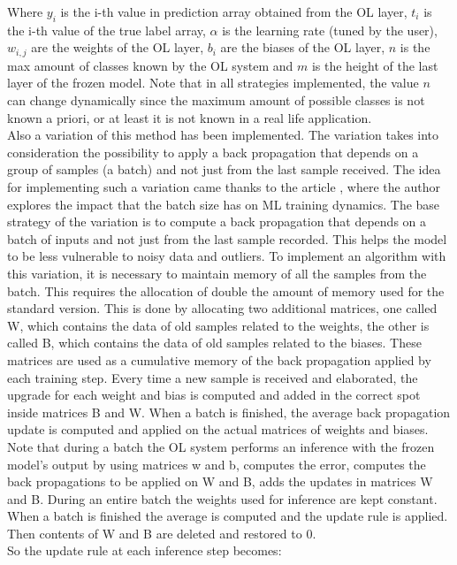 \documentclass[12pt]{report}
\begin{document}
Where $y_i$ is the i-th value in prediction array obtained from the OL layer, $t_i$ is the i-th value of the true label array, $\alpha$ is the learning rate (tuned by the user), $w_{i,j}$ are the weights of the OL layer, $b_i$ are the biases of the OL layer, $n$ is the max amount of classes known by the OL system and $m$ is the height of the last layer of the frozen model. Note that in all strategies implemented, the value $n$ can change dynamically since the maximum amount of possible classes is not known a priori, or at least it is not known in a real life application. \\
Also a variation of this method has been implemented. The variation takes into consideration the possibility to apply a back propagation that depends on a group of samples (a batch) and not just from the last sample received. The idea for implementing such a variation came thanks to the article \autocite{batch_size_medium}, where the author explores the impact that the batch size has on ML training dynamics. The base strategy of the variation is to compute a back propagation that depends on a batch of inputs and not just from the last sample recorded. This helps the model to be less vulnerable to noisy data and outliers. To implement an algorithm with this variation, it is necessary to maintain memory of all the samples from the batch. This requires the allocation of double the amount of memory used for the standard version. This is done by allocating two additional matrices, one called W, which contains the data of old samples related to the weights, the other is called B, which contains the data of old samples related to the biases. These matrices are used as a cumulative memory of the back propagation applied by each training step. Every time a new sample is received and elaborated, the upgrade for each weight and bias is computed and added in the correct spot inside matrices B and W. When a batch is finished, the average back propagation update is computed and applied on the actual matrices of weights and biases. Note that during a batch the OL system performs an inference with the frozen model's output by using matrices w and b, computes the error, computes the back propagations to be applied on W and B, adds the updates in matrices W and B. During an entire batch the weights used for inference are kept constant. When a batch is finished the average is computed and the update rule is applied. Then contents of W and B are deleted and restored to 0. \\
So the update rule at each inference step becomes:
\end{document}
